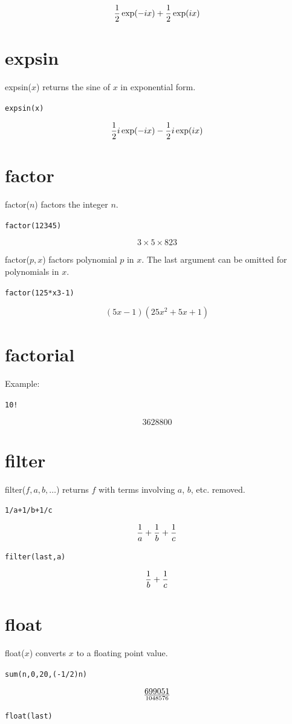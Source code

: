 \documentclass[12pt,openany]{report}
\begin{document}
$${1\over2}\exp(-ix)+{1\over2}\exp(ix)$$

\section*{expsin}
expsin($x$) returns the sine of $x$ in exponential form.

\medskip
{\tt expsin(x)}

$${1\over2}i\exp(-ix)-{1\over2}i\exp(ix)$$

\section*{factor}
factor($n$) factors the integer $n$.

\medskip
{\tt factor(12345)}

$$3\times 5\times 823$$

\medskip
\noindent
factor($p,x$) factors polynomial $p$ in $x$.
The last argument can be omitted for polynomials in $x$.

\medskip
{\tt factor(125*x{}3-1)}

$$(5x-1)(25x^2+5x+1)$$

\section*{factorial}
Example:

\medskip
{\tt 10!}

$$3628800$$

\section*{filter}
filter($f,a,b,\ldots$) returns $f$ with terms involving $a$, $b$, etc. removed.

\medskip
{\tt 1/a+1/b+1/c}

$${1\over a}+{1\over b}+{1\over c}$$

{\tt filter(last,a)}

$${1\over b}+{1\over c}$$

\section*{float}
float($x$) converts $x$ to a floating point value.

\medskip
{\tt sum(n,0,20,(-1/2){}n)}

$$699051\over1048576$$

{\tt float(last)}
\end{document}
